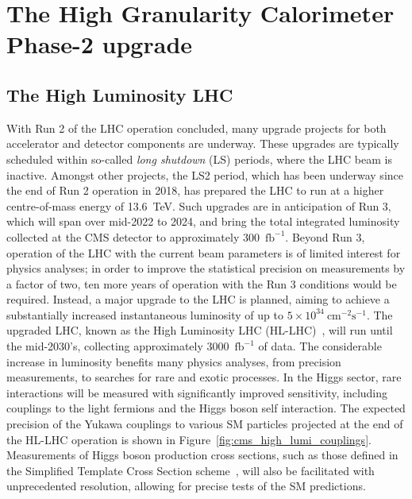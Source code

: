 \section{The High Granularity Calorimeter Phase-2 upgrade}
\label{sec:HGCAL}

\subsection{The High Luminosity LHC}


With Run 2 of the LHC operation concluded, many upgrade projects for both accelerator and detector components are underway. These upgrades are typically scheduled within so-called \textit{long shutdown} (LS) periods, where the LHC beam is inactive. Amongst other projects, the LS2 period, which has been underway since the end of Run 2 operation in 2018, has prepared the LHC to run at a higher centre-of-mass energy of 13.6~TeV. Such upgrades are in anticipation of Run 3, which will span over mid-2022 to 2024, and bring the total integrated luminosity collected at the CMS detector to approximately 300~$\mathrm{fb}^{-1}$. Beyond Run 3, operation of the LHC with the current beam parameters is of limited interest for physics analyses; in order to improve the statistical precision on measurements by a factor of two, ten more years of operation with the Run 3 conditions would be required. Instead, a major upgrade to the LHC is planned, aiming to achieve a substantially increased instantaneous luminosity of up to $5\times10^{34}~\mathrm{cm}^{-2}\mathrm{s}^{-1}$. The upgraded LHC, known as the High Luminosity LHC (HL-LHC)~\cite{HL_LHC}, will run until the mid-2030's, collecting approximately 3000~$\mathrm{fb}^{-1}$ of data. The considerable increase in luminosity benefits many physics analyses, from precision measurements, to searches for rare and exotic processes. In the Higgs sector, rare interactions will be measured with significantly improved sensitivity, including couplings to the light fermions and the Higgs boson self interaction. The expected precision of the Yukawa couplings to various SM particles projected at the end of the HL-LHC operation is shown in Figure~\ref{fig:cms_high_lumi_couplings}. Measurements of Higgs boson production cross sections, such as those defined in the Simplified Template Cross Section scheme~\cite{YR4}, will also be facilitated with unprecedented resolution, allowing for precise tests of the SM predictions.

